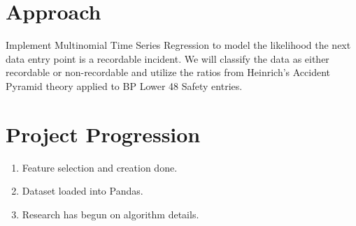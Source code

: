\documentclass{article}
\begin{document}
\section*{Approach} 
Implement Multinomial Time Series Regression to model the likelihood the next data entry point is a recordable incident. We will classify the data as either recordable or non-recordable and utilize the ratios from Heinrich's Accident Pyramid theory applied to BP Lower 48 Safety entries.

\section*{Project Progression} 
\begin{enumerate}
	\item Feature selection and creation done.
	\item Dataset loaded into Pandas.
	\item Research has begun on algorithm details.
\end{enumerate}

\end{document}
